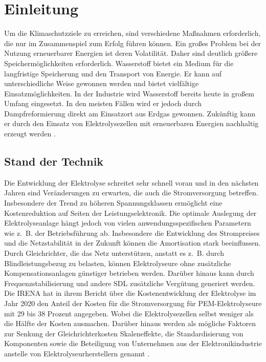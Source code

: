 \chapter{Einleitung}
Um die Klimaschutzziele zu erreichen, sind verschiedene Maßnahmen erforderlich, die nur im Zusammenspiel zum Erfolg führen können. Ein großes Problem bei der Nutzung erneuerbarer Energien ist deren Volatilität. Daher sind deutlich größere Speichermöglichkeiten erforderlich. Wasserstoff bietet ein Medium für die langfristige Speicherung und den Transport von Energie. Er kann auf unterschiedliche Weise gewonnen werden und bietet vielfältige Einsatzmöglichkeiten. In der Industrie wird Wasserstoff bereits heute in großem Umfang eingesetzt. In den meisten Fällen wird er jedoch durch Dampfreformierung direkt am Einsatzort aus Erdgas gewonnen. Zukünftig kann er durch den Einsatz von Elektrolysezellen mit erneuerbaren Energien nachhaltig erzeugt werden \cite{Elektrolyse}. 
\section{Stand der Technik}
Die Entwicklung der Elektrolyse schreitet sehr schnell voran und in den nächsten Jahren sind Veränderungen zu erwarten, die auch die Stromversorgung betreffen. Insbesondere der Trend zu höheren Spannungsklassen ermöglicht eine Kostenreduktion auf Seiten der Leistungselektronik. Die optimale Auslegung der Elektrolyseanlage hängt jedoch von vielen anwendungsspezifischen Parametern wie z.~B. der Betriebsführung ab. Insbesondere die Entwicklung des Strompreises und die Netzstabilität in der Zukunft können die Amortisation stark beeinflussen. Durch Gleichrichter, die das Netz unterstützen, anstatt es z.~B. durch Blindleistungsbezug zu belasten, können Elektrolyseure ohne zusätzliche Kompensationsanlagen günstiger betrieben werden. Darüber hinaus kann durch Frequenzstabilisierung und andere \gls{SDL} zusätzliche Vergütung generiert werden. \\
Die \gls{IRENA} hat in ihrem Bericht über die Kostenentwicklung der Elektrolyse im Jahr 2020 den Anteil der Kosten für die Stromversorgung für \gls{PEM}-Elektrolyseure mit 29 bis 38 Prozent angegeben. Wobei die Elektrolysezellen selbst weniger als die Hälfte der Kosten ausmachen. Darüber hinaus werden als mögliche Faktoren zur Senkung der Gleichrichterkosten Skaleneffekte, die Standardisierung von Komponenten sowie die Beteiligung von Unternehmen aus der Elektronikindustrie anstelle von Elektrolyseurherstellern genannt \cite{IRENA2020}.\\ 

